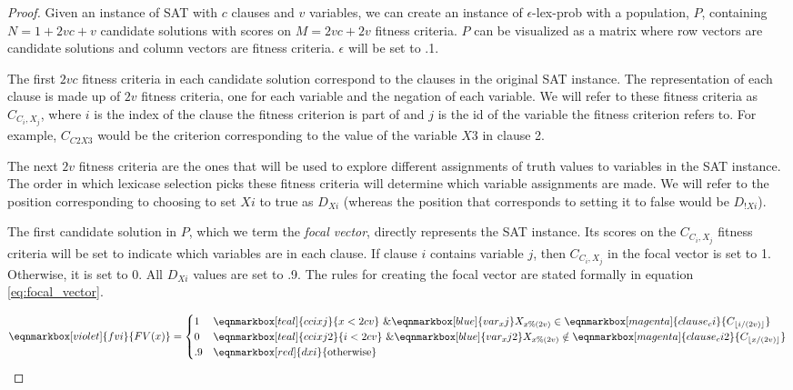 \documentclass[sigconf]{acmart}
\begin{document}
\begin{proof}
Given an instance of {\sc SAT} with $c$ clauses and $v$ variables, we can create an instance of {\sc $\epsilon$-lex-prob} with a population, $P$, containing $N = 1 + 2vc + v$ candidate solutions with scores on $M = 2vc + 2v$ fitness criteria. $P$ can be visualized as a matrix where row vectors are candidate solutions and column vectors are fitness criteria. $\epsilon$ will be set to .1. 

The first $2vc$ fitness criteria in each candidate solution correspond to the clauses in the original {\sc SAT} instance. The representation of each clause is made up of $2v$ fitness criteria, one for each variable and the negation of each variable. We will refer to these fitness criteria as $C_{C_{i},X_{j}}$, where $i$ is the index of the clause the fitness criterion is part of and $j$ is the id of the variable the fitness criterion refers to. For example, $C_{C2X3}$ would be the criterion corresponding to the value of the variable $X3$ in clause 2.

The next $2v$ fitness criteria are the ones that will be used to explore different assignments of truth values to variables in the {\sc SAT} instance. The order in which lexicase selection picks these fitness criteria will determine which variable assignments are made. We will refer to the position corresponding to choosing to set $Xi$ to true as $D_{Xi}$ (whereas the position that corresponds to setting it to false would be $D_{!Xi}$).

The first candidate solution in $P$, which we term the \textit{focal vector}, directly represents the {\sc SAT} instance. Its scores on the $C_{C_{i},X_{j}}$ fitness criteria will be set to indicate which variables are in each clause. If clause $i$ contains variable $j$, then $C_{C_{i},X_{j}}$ in the focal vector is set to 1. Otherwise, it is set to 0. All $D_{Xi}$ values are set to .9. The rules for creating the focal vector are stated formally in equation \ref{eq:focal_vector}.
\vspace{1.5em}

\begin{equation}
\label{eq:focal_vector}
\eqnmarkbox[violet]{fvi}{FV(x)} = \begin{cases} 
1 & \eqnmarkbox[teal]{ccixj}{x < 2cv} \text{ } \& \eqnmarkbox[blue]{var_xj}{X_{x\%(2v)}} \in \eqnmarkbox[magenta]{clause_ci}{C_{\lfloor i/(2v)\rfloor}} \\
0 & \eqnmarkbox[teal]{ccixj2}{i < 2cv} \text{ } \& \eqnmarkbox[blue]{var_xj2}{X_{x\%(2v)}} \notin \eqnmarkbox[magenta]{clause_ci2}{C_{\lfloor x/(2v)\rfloor}} \\
.9 & \eqnmarkbox[red]{dxi}{\text{otherwise}}
\end{cases}
\end{equation}


\end{proof}
\end{document}
